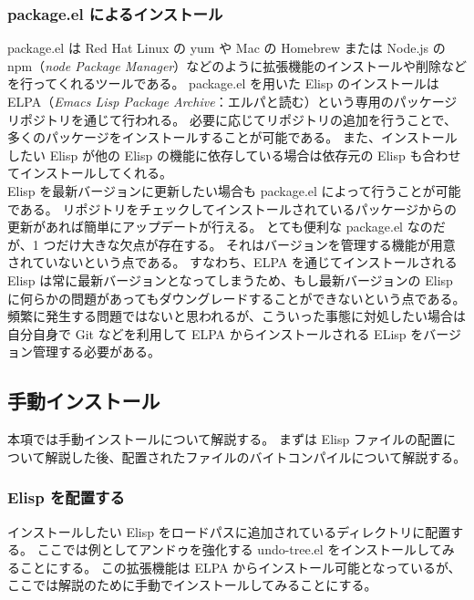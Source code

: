 \subsubsection{package.el によるインストール}
package.el は Red Hat Linux の yum や Mac の Homebrew または Node.js の npm（\emph{node Package Manager}）などのように拡張機能のインストールや削除などを行ってくれるツールである。
package.el を用いた Elisp のインストールは ELPA（\emph{Emacs Lisp Package Archive}：エルパと読む）という専用のパッケージリポジトリを通じて行われる。
必要に応じてリポジトリの追加を行うことで、多くのパッケージをインストールすることが可能である。
また、インストールしたい Elisp が他の Elisp の機能に依存している場合は依存元の Elisp も合わせてインストールしてくれる。\\

Elisp を最新バージョンに更新したい場合も package.el によって行うことが可能である。
リポジトリをチェックしてインストールされているパッケージからの更新があれば簡単にアップデートが行える。
とても便利な package.el なのだが、1 つだけ大きな欠点が存在する。
それはバージョンを管理する機能が用意されていないという点である。
すなわち、ELPA を通じてインストールされる Elisp は常に最新バージョンとなってしまうため、もし最新バージョンの Elisp に何らかの問題があってもダウングレードすることができないという点である。
頻繁に発生する問題ではないと思われるが、こういった事態に対処したい場合は自分自身で Git などを利用して ELPA からインストールされる ELisp をバージョン管理する必要がある。
\subsection{手動インストール}
本項では手動インストールについて解説する。
まずは Elisp ファイルの配置について解説した後、配置されたファイルのバイトコンパイルについて解説する。
\subsubsection{Elisp を配置する}
インストールしたい Elisp をロードパスに追加されているディレクトリに配置する。
ここでは例としてアンドゥを強化する undo-tree.el をインストールしてみることにする。
この拡張機能は ELPA からインストール可能となっているが、ここでは解説のために手動でインストールしてみることにする。\\

